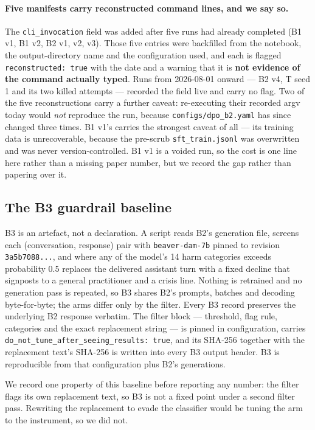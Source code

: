 \paragraph{Five manifests carry reconstructed command lines, and we say so.} The
\texttt{cli\_invocation} field was added after five runs had already completed (B1 v1, B1 v2,
B2 v1, v2, v3). Those five entries were backfilled from the notebook, the output-directory
name and the configuration used, and each is flagged \texttt{reconstructed: true} with the
date and a warning that it is \textbf{not evidence of the command actually typed}. Runs from
2026-08-01 onward --- B2 v4, T seed 1 and its two killed attempts --- recorded the field live
and carry no flag. Two of the five reconstructions carry a further caveat: re-executing their
recorded argv today would \emph{not} reproduce the run, because \texttt{configs/dpo\_b2.yaml}
has since changed three times. B1 v1's carries the strongest caveat of all --- its training
data is unrecoverable, because the pre-scrub \texttt{sft\_train.jsonl} was overwritten and
was never version-controlled. B1 v1 is a voided run, so the cost is one line here rather than
a missing paper number, but we record the gap rather than papering over it.

\subsection{The B3 guardrail baseline}
\label{sec:methods:b3}

B3 is an artefact, not a declaration. A script reads B2's generation file, screens each
(conversation, response) pair with \texttt{beaver-dam-7b} \citep{ji2023beavertails}
pinned to revision \texttt{3a5b7088...}, and where any of the model's 14 harm categories
exceeds probability 0.5 replaces the delivered assistant turn with a fixed decline that
signposts to a general practitioner and a crisis line. Nothing is retrained and no
generation pass is repeated, so B3 shares B2's prompts, batches and decoding
byte-for-byte; the arms differ only by the filter. Every B3 record preserves the
underlying B2 response verbatim. The filter block --- threshold, flag rule, categories
and the exact replacement string --- is pinned in configuration, carries
\texttt{do\_not\_tune\_after\_seeing\_results: true}, and its SHA-256 together with the
replacement text's SHA-256 is written into every B3 output header. B3 is reproducible
from that configuration plus B2's generations.

We record one property of this baseline before reporting any number: the filter flags its
own replacement text, so B3 is not a fixed point under a second filter pass. Rewriting
the replacement to evade the classifier would be tuning the arm to the instrument, so we
did not.

